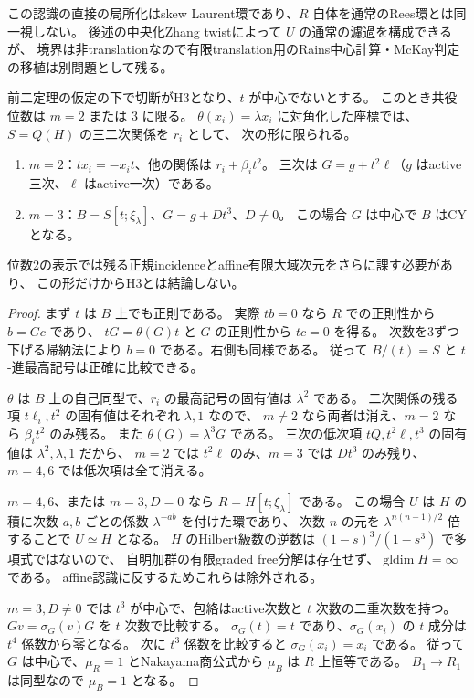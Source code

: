 この認識の直接の局所化はskew Laurent環であり、$R$ 自体を通常のRees環とは同一視しない。
後述の中央化Zhang twistによって $U$ の通常の濾過を構成できるが、
境界は非translationなので有限translation用のRains中心計算・McKay判定の移植は別問題として残る。

\begin{theorem}
\label{thm:normal-elliptic-two-three}
前二定理の仮定の下で切断がH3となり、$t$ が中心でないとする。
このとき共役位数は $m=2$ または $3$ に限る。
$\theta(x_i)=\lambda x_i$ に対角化した座標では、$S=Q(H)$ の三二次関係を $r_i$ として、
次の形に限られる。
\begin{enumerate}
\item $m=2$：$tx_i=-x_it$、他の関係は $r_i+\beta_it^2$。
三次は $G=g+t^2\ell$（$g$ はactive三次、$\ell$ はactive一次）である。
\item $m=3$：$B=S[t;\xi_\lambda]$、$G=g+Dt^3$、$D\ne0$。
この場合 $G$ は中心で $B$ はCYとなる。
\end{enumerate}
位数2の表示では残る正規incidenceとaffine有限大域次元をさらに課す必要があり、
この形だけからH3とは結論しない。
\end{theorem}
\begin{proof}
まず $t$ は $B$ 上でも正則である。
実際 $tb=0$ なら $R$ での正則性から $b=Gc$ であり、
$tG=\theta(G)t$ と $G$ の正則性から $tc=0$ を得る。
次数を3ずつ下げる帰納法により $b=0$ である。右側も同様である。
従って $B/(t)=S$ と $t$-進最高記号は正確に比較できる。

$\theta$ は $B$ 上の自己同型で、$r_i$ の最高記号の固有値は $\lambda^2$ である。
二次関係の残る項 $t\ell_i,t^2$ の固有値はそれぞれ $\lambda,1$ なので、
$m\ne2$ なら両者は消え、$m=2$ なら $\beta_i t^2$ のみ残る。
また $\theta(G)=\lambda^3G$ である。
三次の低次項 $tQ,t^2\ell,t^3$ の固有値は $\lambda^2,\lambda,1$ だから、
$m=2$ では $t^2\ell$ のみ、$m=3$ では $Dt^3$ のみ残り、
$m=4,6$ では低次項は全て消える。

$m=4,6$、または $m=3,D=0$ なら $R=H[t;\xi_\lambda]$ である。
この場合 $U$ は $H$ の積に次数 $a,b$ ごとの係数 $\lambda^{-ab}$ を付けた環であり、
次数 $n$ の元を $\lambda^{n(n-1)/2}$ 倍することで $U\simeq H$ となる。
$H$ のHilbert級数の逆数は $(1-s)^3/(1-s^3)$ で多項式ではないので、
自明加群の有限graded free分解は存在せず、$\operatorname{gldim}H=\infty$ である。
affine認識に反するためこれらは除外される。

$m=3,D\ne0$ では $t^3$ が中心で、包絡はactive次数と $t$ 次数の二重次数を持つ。
$Gv=\sigma_G(v)G$ を $t$ 次数で比較する。
$\sigma_G(t)=t$ であり、$\sigma_G(x_i)$ の $t$ 成分は $t^4$ 係数から零となる。
次に $t^3$ 係数を比較すると $\sigma_G(x_i)=x_i$ である。
従って $G$ は中心で、$\mu_R=1$ とNakayama商公式から
$\mu_B$ は $R$ 上恒等である。
$B_1\to R_1$ は同型なので $\mu_B=1$ となる。
\end{proof}


